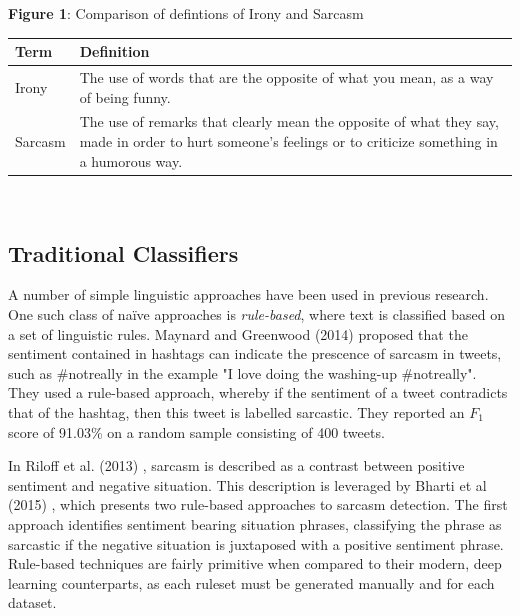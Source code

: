 \documentclass[12pt,a4paper]{article}
\begin{document}
\begin{center}
	\textbf{Figure 1}: Comparison of defintions of Irony and Sarcasm
\end{center}
\begin{center}
\begin{tabular}{p{1.5cm}p{13cm}}
	\hline
	\textbf{Term} & \textbf{Definition}\\
	\hline\hline
	Irony & The use of words that are the opposite of what you mean, as a way of being funny.
	\footnotemark[1]\\
	\hline
	Sarcasm & The use of remarks that clearly mean the opposite of what they say, made in order to hurt someone's feelings or to criticize something in a humorous way.\footnotemark[2]\\
	\hline
\end{tabular}\\
\end{center}

\subsection{Traditional Classifiers}
\noindent A number of simple linguistic approaches have been used in previous research. One such class of na\"{i}ve approaches is \textit{rule-based}, where text is classified based on a set of linguistic rules. Maynard and Greenwood (2014) \cite{maynard2014cares} proposed that the sentiment contained in hashtags can indicate the prescence of sarcasm in tweets, such as \#notreally in the example "I love doing the washing-up \#notreally". They used a rule-based approach, whereby if the sentiment of a tweet contradicts that of the hashtag, then this tweet is labelled sarcastic. They reported an $F_{1}$ score of 91.03\% on a random sample consisting of 400 tweets.

In Riloff et al. (2013) \cite{riloff2013sarcasm}, sarcasm is described as a contrast between positive sentiment and negative situation. This description is leveraged by Bharti et al (2015) \cite{bharti2015parsing}, which presents two rule-based approaches to sarcasm detection. The first approach identifies sentiment bearing situation phrases, classifying the phrase as sarcastic if the negative situation is juxtaposed with a positive sentiment phrase. Rule-based techniques are fairly primitive when compared to their modern, deep learning counterparts, as each ruleset must be generated manually and for each dataset.
\end{document}
